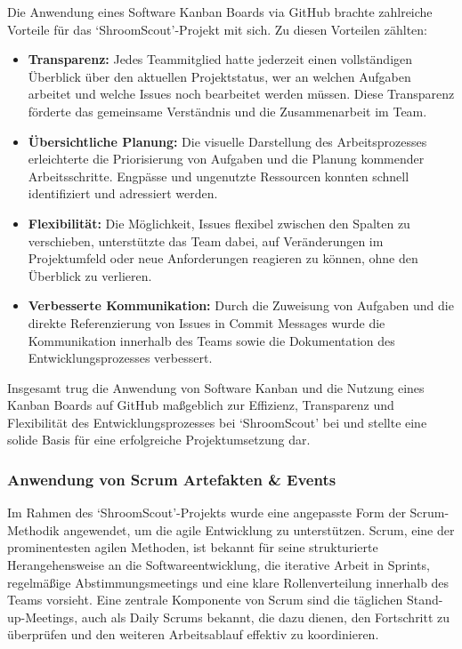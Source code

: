 \documentclass[../main.tex]{subfiles} %
\begin{document}
Die Anwendung eines Software Kanban Boards via GitHub brachte zahlreiche Vorteile für das `ShroomScout'-Projekt mit sich. Zu diesen Vorteilen zählten:

\begin{itemize}

	\item \textbf{Transparenz:}
	      Jedes Teammitglied hatte jederzeit einen vollständigen Überblick über den aktuellen Projektstatus, wer an welchen Aufgaben arbeitet und welche
	      Issues noch bearbeitet werden müssen. Diese Transparenz förderte das gemeinsame Verständnis und die Zusammenarbeit im Team.

	\item \textbf{Übersichtliche Planung:}
	      Die visuelle Darstellung des Arbeitsprozesses erleichterte die Priorisierung von Aufgaben und die Planung kommender Arbeitsschritte.
	      Engpässe und ungenutzte Ressourcen konnten schnell identifiziert und adressiert werden.

	\item \textbf{Flexibilität:}
	      Die Möglichkeit, Issues flexibel zwischen den Spalten zu verschieben, unterstützte das Team dabei, auf Veränderungen im Projektumfeld oder neue
	      Anforderungen reagieren zu können, ohne den Überblick zu verlieren.

	\item \textbf{Verbesserte Kommunikation:}
	      Durch die Zuweisung von Aufgaben und die direkte Referenzierung von Issues in Commit Messages wurde die Kommunikation innerhalb
	      des Teams sowie die Dokumentation des Entwicklungsprozesses verbessert.

\end{itemize}

Insgesamt trug die Anwendung von Software Kanban und die Nutzung eines Kanban Boards auf GitHub maßgeblich zur Effizienz, Transparenz und Flexibilität des
Entwicklungsprozesses bei `ShroomScout' bei und stellte eine solide Basis für eine erfolgreiche Projektumsetzung dar.

\subsubsection{Anwendung von Scrum Artefakten \& Events}

Im Rahmen des `ShroomScout'-Projekts wurde eine angepasste Form der Scrum-Methodik angewendet, um die agile Entwicklung zu unterstützen. Scrum, eine der
prominentesten agilen Methoden, ist bekannt für seine strukturierte Herangehensweise an die Softwareentwicklung, die iterative Arbeit in Sprints, regelmäßige
Abstimmungsmeetings und eine klare Rollenverteilung innerhalb des Teams vorsieht. Eine zentrale Komponente von Scrum sind die täglichen Stand-up-Meetings, auch
als Daily Scrums bekannt, die dazu dienen, den Fortschritt zu überprüfen und den weiteren Arbeitsablauf effektiv zu koordinieren.
\end{document}
